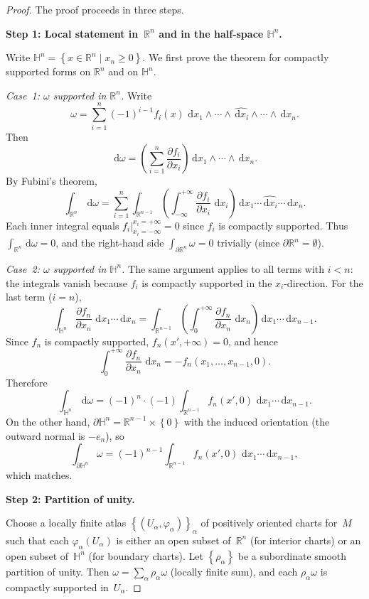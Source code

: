 \documentclass[12pt,a4paper,openany]{book}
\theoremstyle{definition}
\theoremstyle{remark}
\newcommand{\R}{\mathbb{R}}
\newcommand{\dd}{\,\mathrm{d}}
\newcommand{\set}[1]{\left\{ #1 \right\}}
\begin{document}
\begin{proof}
The proof proceeds in three steps.

\medskip\noindent\textbf{Step 1: Local statement in~$\R^n$ and in the
half-space $\mathbb{H}^n$.}

Write $\mathbb{H}^n = \set{x\in\R^n \mid x_n\ge 0}$.  We first prove the
theorem for compactly supported forms on $\R^n$ and on $\mathbb{H}^n$.

\emph{Case~1: $\omega$ supported in $\R^n$.}\;  Write
\[
  \omega = \sum_{i=1}^n (-1)^{i-1} f_i(x)\, \dd x_1\wedge\cdots
  \wedge\widehat{\dd x_i}\wedge\cdots\wedge \dd x_n.
\]
Then
\[
  \dd\omega = \left(\sum_{i=1}^n \frac{\partial f_i}{\partial x_i}\right)
  \dd x_1\wedge\cdots\wedge \dd x_n.
\]
By Fubini's theorem,
\[
  \int_{\R^n}\dd\omega
  = \sum_{i=1}^n \int_{\R^{n-1}}\left(
    \int_{-\infty}^{+\infty} \frac{\partial f_i}{\partial x_i}\,\dd x_i
  \right)\dd x_1\cdots\widehat{\dd x_i}\cdots\dd x_n.
\]
Each inner integral equals $f_i\big|_{x_i=-\infty}^{x_i=+\infty} = 0$
since $f_i$ is compactly supported.  Thus $\int_{\R^n}\dd\omega = 0$,
and the right-hand side $\int_{\partial\R^n}\omega = 0$ trivially
(since $\partial\R^n = \emptyset$).

\emph{Case~2: $\omega$ supported in $\mathbb{H}^n$.}\;  The same
argument applies to all terms with $i < n$: the integrals vanish because
$f_i$ is compactly supported in the $x_i$-direction.  For the last term
($i = n$),
\[
  \int_{\mathbb{H}^n} \frac{\partial f_n}{\partial x_n}
  \,\dd x_1\cdots \dd x_n
  = \int_{\R^{n-1}}\left(
    \int_0^{+\infty}\frac{\partial f_n}{\partial x_n}\,\dd x_n
  \right) \dd x_1\cdots \dd x_{n-1}.
\]
Since $f_n$ is compactly supported, $f_n(x',+\infty) = 0$, and hence
\[
  \int_0^{+\infty}\frac{\partial f_n}{\partial x_n}\,\dd x_n
  = -f_n(x_1,\dots,x_{n-1},0).
\]
Therefore
\[
  \int_{\mathbb{H}^n}\dd\omega
  = (-1)^n\cdot(-1)\int_{\R^{n-1}} f_n(x',0)\,\dd x_1\cdots \dd x_{n-1}.
\]
On the other hand, $\partial\mathbb{H}^n = \R^{n-1}\times\set{0}$
with the induced orientation (the outward normal is $-e_n$), so
\[
  \int_{\partial\mathbb{H}^n}\omega
  = (-1)^{n-1}\int_{\R^{n-1}} f_n(x',0)\,\dd x_1\cdots \dd x_{n-1},
\]
which matches.

\medskip\noindent\textbf{Step 2: Partition of unity.}

Choose a locally finite atlas $\set{(U_\alpha,\varphi_\alpha)}_\alpha$
of positively oriented charts for~$M$ such that each $\varphi_\alpha(U_\alpha)$
is either an open subset of~$\R^n$ (for interior charts) or an open
subset of~$\mathbb{H}^n$ (for boundary charts).  Let $\set{\rho_\alpha}$
be a subordinate smooth partition of unity.  Then
$\omega = \sum_\alpha \rho_\alpha\omega$ (locally finite sum), and each
$\rho_\alpha\omega$ is compactly supported in~$U_\alpha$.


\end{proof}
\end{document}
